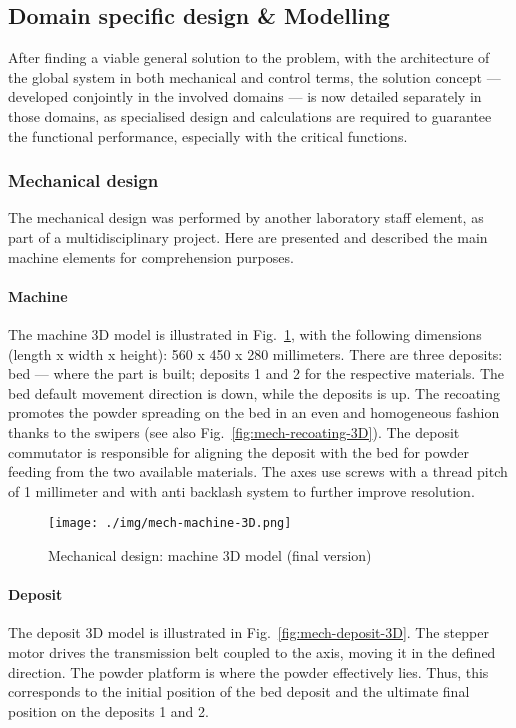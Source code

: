 \subsection{Domain specific design \textup\& Modelling}%
\label{subsec:doma-spec-design}
After finding a viable general solution to the problem, with the architecture of
the global system in both mechanical and control terms, the solution concept ---
developed conjointly in the involved domains --- is now detailed separately in
those domains, as specialised design and calculations are required to
guarantee the functional performance, especially with the critical functions.

% 
\subsubsection{Mechanical design}%
\label{subsubsec:mechanical-design}
The mechanical design was performed by another laboratory staff element, as part
of a multidisciplinary project. Here are presented and described the main
machine elements for comprehension purposes.

\paragraph{Machine}
The machine 3D model is illustrated in Fig.~\ref{fig:mech-mach-3D}, with
the following dimensions (length x width x height): 560 x 450 x 280 millimeters.
There are three deposits: bed --- where the part is built; deposits 1 and 2 for the
respective materials. The bed default movement direction is down, while the
deposits is up. The recoating promotes the powder spreading on the bed in
an even and homogeneous fashion thanks to the swipers (see also
Fig.~\ref{fig:mech-recoating-3D}). The deposit commutator is responsible for
aligning the deposit with the bed for powder feeding from the two available
materials. The axes use screws with a thread pitch of 1 millimeter and with anti backlash system to further improve resolution.
% 
\begin{figure}[!hbt]
  \centering
  \texttt{[image: ./img/mech-machine-3D.png]}
  \caption{Mechanical design: machine 3D model (final version)}
  \label{fig:mech-mach-3D}
\end{figure}

\paragraph{Deposit}
The deposit 3D model is illustrated in Fig.~\ref{fig:mech-deposit-3D}. The
stepper motor drives the transmission belt coupled to the axis, moving it in the
defined direction. The powder platform is where the powder effectively
lies. Thus, this corresponds to the initial position of the bed deposit and the
ultimate final position on the deposits 1 and 2.


